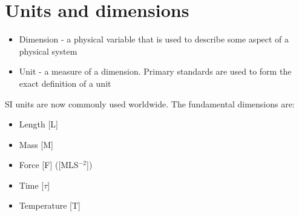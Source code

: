 \section{Units and dimensions}
\begin{itemize}
  \item Dimension - a physical variable that is used to describe some aspect of a physical system
  \item Unit - a measure of a dimension. Primary standards are used to form the exact definition of a unit
\end{itemize}
SI units are now commonly used worldwide. The fundamental dimensions are:
\begin{itemize}
  \item Length [L]
  \item Mass [M]
  \item Force [F] ([MLS$^{-2}$])
  \item Time [$\tau$]
  \item Temperature [T]
\end{itemize}